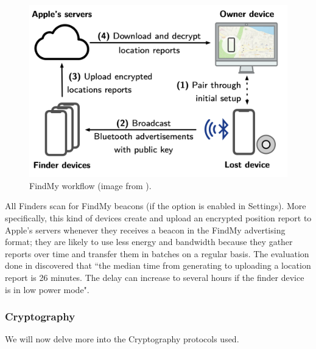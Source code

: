 \documentclass[english]{article}
\begin{document}
\begin{figure}[]
	\centering
	\includegraphics[width=.5\textwidth]{images/process.png}
	\caption{FindMy workflow (image from \cite{whocanfind}).}
	\label{process}
\end{figure}
All Finders scan for FindMy beacons (if the option is enabled in Settings).
More specifically, this kind of devices create and upload an encrypted position report to Apple's servers whenever they receives a beacon in the FindMy advertising format; they are likely to use less energy and bandwidth because they gather reports over time and transfer them in batches on a regular basis. The evaluation done in \cite{whocanfind} discovered that ``the median time from generating to uploading a location report is 26 minutes. The delay can increase to several hours if the finder device is in low power mode".

\subsubsection{Cryptography} \label{sec:crypto}
We will now delve more into the Cryptography protocols used. 
\end{document}
